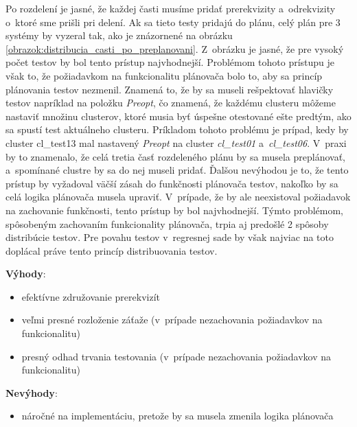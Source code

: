Po rozdelení je jasné, že každej časti musíme pridať prerekvizity a~odrekvizity
o~ktoré sme prišli pri delení. Ak sa tieto testy pridajú do plánu, celý plán
pre 3 systémy by vyzeral tak, ako je znázornené na obrázku \ref{obrazok:distribucia_casti_po_preplanovani}.
Z~obrázku je jasné, že pre vysoký počet testov by bol tento prístup najvhodnejší.
Problémom tohoto prístupu je však to, že požiadavkom na funkcionalitu plánovača bolo to,
aby sa princíp plánovania testov nezmenil. Znamená to, že by sa museli rešpektovať hlavičky testov
napríklad na položku \emph{Preopt}, čo znamená, že každému clusteru môžeme nastaviť množinu clusterov,
ktoré musia byť úspešne otestované ešte predtým, ako sa spustí test aktuálneho clusteru.
Príkladom tohoto problému je prípad, kedy by cluster cl\_test13 mal nastavený 
\emph{Preopt} na cluster \emph{cl\_test01} a~\emph{cl\_test06}.
V~praxi by to znamenalo, že celá tretia časť rozdeleného plánu by sa musela preplánovať,
a~spomínané clustre by sa do nej museli pridať. Ďalšou nevýhodou je to, že tento prístup by
vyžadoval väčší zásah do funkčnosti plánovača testov, nakoľko by sa celá logika plánovača musela upraviť.
V~prípade, že by ale neexistoval požiadavok na zachovanie funkčnosti, tento prístup by bol najvhodnejší.
Týmto problémom, spôsobeným zachovaním funkcionality plánovača, trpia aj predošlé 2 spôsoby distribúcie testov. 
Pre povahu testov v~regresnej sade by však najviac na toto doplácal práve tento princíp distribuovania testov.  

\noindent \textbf{Výhody}:
\begin{itemize}
\item efektívne združovanie prerekvizít
\item veľmi presné rozloženie záťaže (v~prípade nezachovania požiadavkov na funkcionalitu)
\item presný odhad trvania testovania (v~prípade nezachovania požiadavkov na funkcionalitu)
\end{itemize} 

\noindent \textbf{Nevýhody}:
\begin{itemize}
\item náročné na implementáciu, pretože by sa musela zmenila logika plánovača
\end{itemize}

